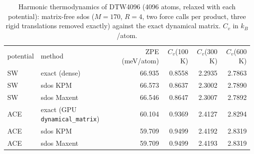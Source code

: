 \begin{table}[t]\caption{Harmonic thermodynamics of DTW4096 (4096 atoms, relaxed with each potential): matrix-free sdos ($M=170$, $R=4$, two force calls per product, three rigid translations removed exactly) against the exact dynamical matrix. $C_v$ in $k_B$/atom.}\label{tab:ph}\begin{ruledtabular}\begin{tabular}{llrrrr}
potential & method & ZPE (meV/atom) & $C_v$(100 K) & $C_v$(300 K) & $C_v$(600 K) \\ \colrule
SW & exact (dense) & 66.935 & 0.8558 & 2.2935 & 2.7863 \\
SW & sdos KPM & 66.573 & 0.8637 & 2.3002 & 2.7890 \\
SW & sdos Maxent & 66.546 & 0.8647 & 2.3007 & 2.7892 \\
\colrule
ACE & exact (GPU \texttt{dynamical\_matrix}) & 60.104 & 0.9369 & 2.4127 & 2.8294 \\
ACE & sdos KPM & 59.709 & 0.9499 & 2.4192 & 2.8319 \\
ACE & sdos Maxent & 59.709 & 0.9499 & 2.4193 & 2.8319 \\
\end{tabular}\end{ruledtabular}\end{table}
